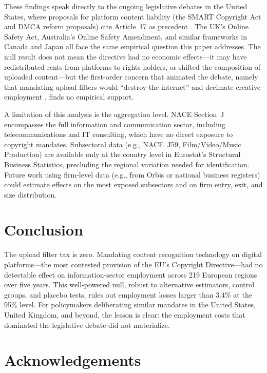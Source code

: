\documentclass[12pt]{article}
\begin{document}
These findings speak directly to the ongoing legislative debates in the United States, where proposals for platform content liability (the SMART Copyright Act and DMCA reform proposals) cite Article~17 as precedent \citep{samuelson2021copyright}. The UK's Online Safety Act, Australia's Online Safety Amendment, and similar frameworks in Canada and Japan all face the same empirical question this paper addresses. The null result does not mean the directive had no economic effects---it may have redistributed rents from platforms to rights holders, or shifted the composition of uploaded content---but the first-order concern that animated the debate, namely that mandating upload filters would ``destroy the internet'' and decimate creative employment \citep{senftleben2020copyright}, finds no empirical support.

A limitation of this analysis is the aggregation level. NACE Section~J encompasses the full information and communication sector, including telecommunications and IT consulting, which have no direct exposure to copyright mandates. Subsectoral data (e.g., NACE~J59, Film/Video/Music Production) are available only at the country level in Eurostat's Structural Business Statistics, precluding the regional variation needed for identification. Future work using firm-level data (e.g., from Orbis or national business registers) could estimate effects on the most exposed subsectors and on firm entry, exit, and size distribution.

\section{Conclusion}

The upload filter tax is zero. Mandating content recognition technology on digital platforms---the most contested provision of the EU's Copyright Directive---had no detectable effect on information-sector employment across 219 European regions over five years. This well-powered null, robust to alternative estimators, control groups, and placebo tests, rules out employment losses larger than 3.4\% at the 95\% level. For policymakers deliberating similar mandates in the United States, United Kingdom, and beyond, the lesson is clear: the employment costs that dominated the legislative debate did not materialize.

\section*{Acknowledgements}
\end{document}
